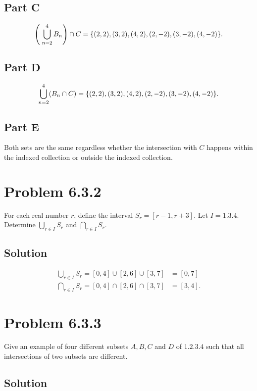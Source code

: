 \documentclass[12pt]{extarticle}
\begin{document}
\subsection*{Part C}
\[
	\qty(\;\bigcup\limits_{n=2}^4 B_n) \cap C = \qty{
		(2,2),
		(3,2),
		(4,2),
		(2,-2),
		(3,-2),
		(4,-2)
	}
.\]


\subsection*{Part D}

\[
	\bigcup\limits_{n=2}^4 (B_n \cap C) = \qty{
		(2,2),
		(3,2),
		(4,2),
		(2,-2),
		(3,-2),
		(4,-2)
	}
.\]

\subsection*{Part E}

Both sets are the same regardless whether the intersection with $C$ happens within the indexed collection or outside the indexed collection.

\section*{Problem 6.3.2}

For each real number $r$, define the interval $S_r = [r-1, r+3]$. Let $I = \qty{1,3,4}$. Determine $\bigcup\limits_{r\in I} S_r$ and $\bigcap\limits_{r\in I} S_r$.

\subsection*{Solution}

\begin{align*}
	\bigcup\limits_{r\in I} S_r = [0,4] \cup [2,6] \cup [3,7] &= [0,7] \\
	\bigcap\limits_{r\in I} S_r = [0,4] \cap [2,6] \cap [3,7] &= [3,4]
.\end{align*}


\section*{Problem 6.3.3}

Give an example of four different subsets $A, B, C$ and $D$ of $\qty{1, 2, 3, 4}$ such that all intersections of two subsets are different.

\subsection*{Solution}
\end{document}
